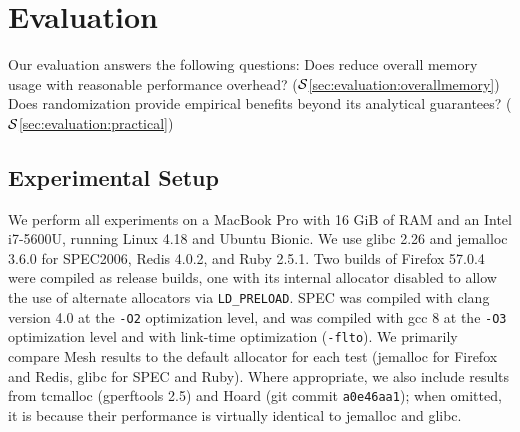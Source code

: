 \section{Evaluation}
\label{sec:evaluation}



Our evaluation answers the following questions: Does \Mesh reduce
overall memory usage with reasonable performance overhead?
($\S$\ref{sec:evaluation:overallmemory}) Does randomization
provide empirical benefits beyond its analytical guarantees?
($\S$\ref{sec:evaluation:practical})




\subsection{Experimental Setup}
\label{subsec:memory-use}

We perform all experiments on a MacBook Pro with 16 GiB of RAM and an
Intel i7-5600U, running Linux 4.18 and Ubuntu Bionic. We use glibc
2.26 and jemalloc 3.6.0 for SPEC2006, Redis 4.0.2, and Ruby 2.5.1.
Two builds of Firefox 57.0.4 were compiled as release builds, one with
its internal allocator disabled to allow the use of alternate
allocators via \texttt{LD\_PRELOAD}.  SPEC was compiled with clang
version 4.0 at the \texttt{-O2} optimization level, and \Mesh was
compiled with gcc 8 at the \texttt{-O3} optimization level and with
link-time optimization (\texttt{-flto}).  We primarily compare Mesh
results to the default allocator for each test (jemalloc for Firefox
and Redis, glibc for SPEC and Ruby). Where appropriate, we also include
results from tcmalloc (gperftools 2.5) and Hoard (git commit
\texttt{a0e46aa1}); when omitted, it is because their performance is virtually identical
to jemalloc and glibc.

